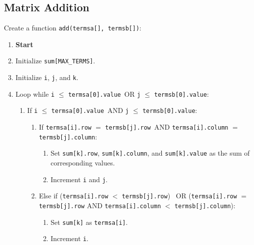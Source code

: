 \subsection{Matrix Addition}
  Create a function \texttt{add(termsa[], termsb[])}:
\begin{enumerate}[label=\arabic*:,left=0pt]
      \item \textbf{Start}
      \item Initialize \texttt{sum[MAX\_TERMS]}.
      \item Initialize \texttt{i}, \texttt{j}, and \texttt{k}.
      \item Loop while \texttt{i} $\leq$ \texttt{termsa[0].value}\ OR \texttt{j} $\leq$ \texttt{termsb[0].value}:
        \begin{enumerate}[label=4.\arabic*:]
          \item If \texttt{i} $\leq$ \texttt{termsa[0].value}\ AND \texttt{j} $\leq$ \texttt{termsb[0].value}:
            \begin{enumerate}[label=4.1.\arabic*:]
              \item If \texttt{termsa[i].row} $=$ \texttt{termsb[j].row}\ AND \texttt{termsa[i].column} $=$ \texttt{termsb[j].column}:
                    \begin{enumerate}[label=4.1.1.\arabic*:]
                      \item Set \texttt{sum[k].row}, \texttt{sum[k].column}, and \texttt{sum[k].value} as the sum of corresponding values.
                        \item Increment \texttt{i} and \texttt{j}.
                    \end{enumerate}

              \item Else if (\texttt{termsa[i].row} $<$ \texttt{termsb[j].row}) \ OR (\texttt{termsa[i].row} $=$ \texttt{termsb[j].row} AND \texttt{termsa[i].column} $<$ \texttt{termsb[j].column}):
                \begin{enumerate}[label=4.1.2.\arabic*:]
                    \item Set \texttt{sum[k]} as \texttt{termsa[i]}.
                    \item Increment \texttt{i}.
                \end{enumerate}


\end{enumerate}
\end{enumerate}
\end{enumerate}
